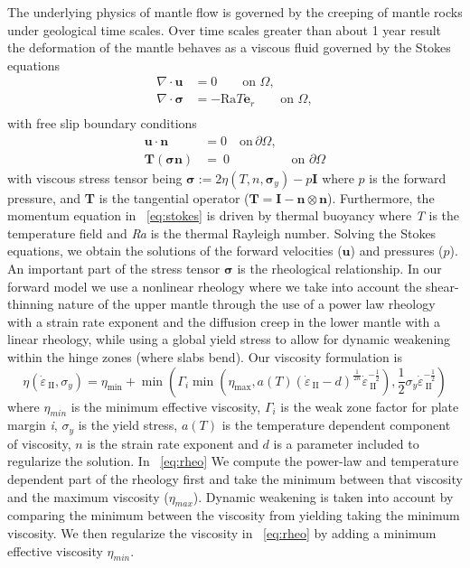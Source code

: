 \documentclass[12pt]{article}
\newcommand{\IIinv}{{\dot\varepsilon}_{\mathrm{\!\!\:II}}}
\newcommand{\uu}{{\ensuremath{\boldsymbol{u}}}}
\newcommand{\ssigma}{{\ensuremath{\boldsymbol{\sigma}}}}
\begin{document}
The underlying physics of mantle flow is governed by the creeping of mantle rocks under geological time scales. 
Over time scales greater than about 1 year result the deformation of the mantle behaves as a viscous fluid governed by the Stokes equations
\begin{equation}
  \label{eq:stokes}
  \begin{split}
    \nabla \cdot \uu &=0 \qquad  \text{on } \Omega, \\
    \nabla \cdot \ssigma&=-\text{Ra}T \textbf{e}_r  \qquad \text{on } \Omega, \\
  \end{split}
\end{equation}
with free slip boundary conditions
\begin{align*}
  \uu\cdot \textbf{n}&=0 \quad \text{on} \, \partial \Omega, \\
  \textbf{T}(\ssigma \textbf{n})
  &= \:0 & \text{ on }\partial \Omega
  \label{eq:bc}
\end{align*}
with viscous stress tensor being  $\ssigma := 2\eta(T,n,\ssigma_y)-p\textbf{I}$ where $p$ is the forward pressure, and \textbf{T} is the tangential operator ($\textbf{T} = \textbf{I} - \textbf{n} \otimes \textbf{n}$). Furthermore, the momentum equation in ~\eqref{eq:stokes} is driven by thermal buoyancy where \textit{T} is the temperature field and \textit{Ra} is the thermal Rayleigh number. Solving the Stokes equations, we obtain the solutions of the forward velocities ($\uu$) and pressures ($p$). An important part of the stress tensor $\ssigma$ is the rheological relationship. In our forward model we use a nonlinear rheology where we take into account the shear-thinning nature of the upper mantle through the use of a power law rheology with a strain rate exponent
and the diffusion creep in the lower mantle with a linear rheology, while using a global yield stress to allow for dynamic weakening within the hinge zones (where slabs bend). 
Our viscosity formulation is 
\begin{equation}
    \eta(\IIinv,\sigma_{y}) =
\eta_{\min} + \min(\Gamma_i\min(\eta_{\max},a(T)(\IIinv-d)^{\frac{1}{2n}}\IIinv^{-\frac{1}{2}}),
\frac{1}{2}\sigma_y\IIinv^{-\frac{1}{2}})
\label{eq:rheo}
  \end{equation}
where $\eta_{min}$ is the minimum effective viscosity, $\Gamma_i$ is the weak zone factor for plate margin \textit{i}, $\sigma_y$ is the yield stress, $a(T)$ is the temperature dependent component of viscosity, $n$ is the strain rate exponent and $d$ is a parameter included to regularize the solution. In ~\eqref{eq:rheo} We compute the power-law and temperature dependent part of the rheology first and take the minimum between that viscosity and the maximum viscosity ($\eta_{max}$). Dynamic weakening is taken into account by comparing the minimum between the viscosity from yielding taking the minimum viscosity. We then regularize the viscosity in ~\eqref{eq:rheo} by adding a minimum effective viscosity $\eta_{min}$.
\end{document}
